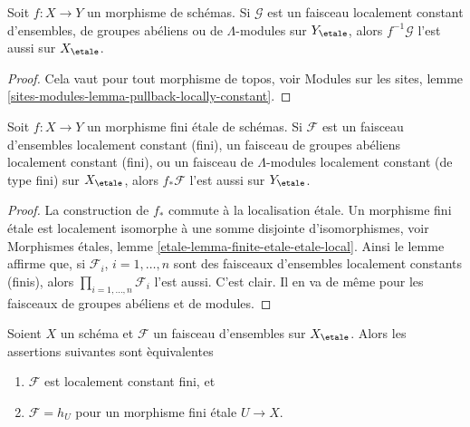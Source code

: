 \begin{lemma}
\label{lemma-pullback-locally-constant}
Soit $f : X \to Y$ un morphisme de sch\'emas. Si $\mathcal{G}$ est un
faisceau localement constant d'ensembles, de groupes ab\'eliens ou de $\Lambda$-modules
sur $Y_\etale$, alors $f^{-1}\mathcal{G}$ l'est aussi
sur $X_\etale$.
\end{lemma}

\begin{proof}
Cela vaut pour tout morphisme de topos, voir
Modules sur les sites, lemme \ref{sites-modules-lemma-pullback-locally-constant}.
\end{proof}

\begin{lemma}
\label{lemma-pushforward-locally-constant}
Soit $f : X \to Y$ un morphisme fini \'etale de sch\'emas.
Si $\mathcal{F}$ est un faisceau d'ensembles localement constant (fini),
un faisceau de groupes ab\'eliens localement constant (fini), ou
un faisceau de $\Lambda$-modules localement constant (de type fini)
sur $X_\etale$, alors $f_*\mathcal{F}$ l'est aussi
sur $Y_\etale$.
\end{lemma}

\begin{proof}
La construction de $f_*$ commute \`a la localisation \'etale.
Un morphisme fini \'etale est localement isomorphe \`a une somme disjointe
d'isomorphismes, voir
Morphismes étales, lemme \ref{etale-lemma-finite-etale-etale-local}.
Ainsi le lemme affirme que, si $\mathcal{F}_i$, $i = 1, \ldots, n$
sont des faisceaux d'ensembles localement constants (finis), alors
$\prod_{i = 1, \ldots, n} \mathcal{F}_i$ l'est aussi.
C'est clair. Il en va de m\^eme pour les faisceaux de groupes ab\'eliens et de modules.
\end{proof}

\begin{lemma}
\label{lemma-characterize-finite-locally-constant}
Soient $X$ un sch\'ema et $\mathcal{F}$ un faisceau d'ensembles sur $X_\etale$.
Alors les assertions suivantes sont \`equivalentes
\begin{enumerate}
\item $\mathcal{F}$ est localement constant fini, et
\item $\mathcal{F} = h_U$ pour un morphisme fini \'etale $U \to X$.
\end{enumerate}
\end{lemma}

